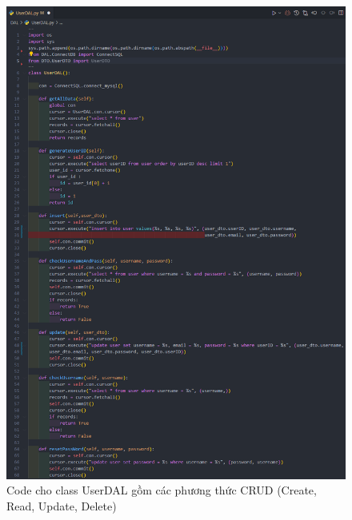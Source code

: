 \documentclass[a4paper]{article}
\begin{document}
\newpage
\begin{figure}[h]
	\centering
	\includegraphics[width=\textwidth]{images/userDAL.png}
	\caption{Code cho class UserDAL gồm các phương thức CRUD (Create, Read, Update, Delete)}
\end{figure}
\clearpage
\newpage
\end{document}
